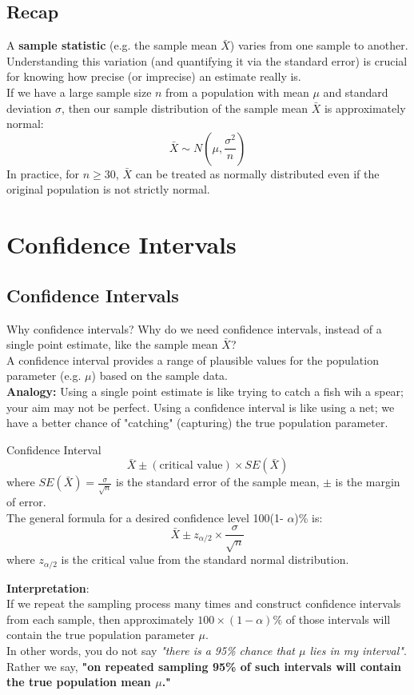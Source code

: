 \documentclass[10pt]{extarticle}
\begin{document}
\subsection{Recap}
A \textbf{sample statistic} (e.g. the sample mean $\bar{X}$) varies from one sample to another. Understanding this variation (and quantifying it via the standard error) is crucial for knowing how precise (or imprecise) an estimate really is. \\[2ex]
If we have a large sample size $n$ from a population with mean $\mu$ and standard deviation $\sigma$, then our sample distribution of the sample mean $\bar{X}$ is approximately normal:
$$\bar{X} \sim N\left(\mu, \frac{\sigma^2}{n}\right)$$
In practice, for $n \geq 30$, $\bar{X}$ can be treated as normally distributed even if the original population is not strictly normal.

\section{Confidence Intervals}

\subsection{Confidence Intervals}
\begin{conceptbox}{Why confidence intervals?}{}
    Why do we need confidence intervals, instead of a single point estimate, like the sample mean $\bar{X}$? \\

    A confidence interval provides a range of plausible values for the population parameter (e.g. $\mu$) based on the sample data. \\

    \textbf{Analogy:}  Using a single point estimate is like trying to catch a fish wih a spear; your aim may not be perfect. Using a confidence interval is like using a net; we have a better chance of "catching" (capturing) the true population parameter.
\end{conceptbox}
\begin{definitionbox}{Confidence Interval}{}
    $$\bar{X} \pm (\text{critical value}) \times SE(\bar{X})$$
    where $SE(\bar{X}) = \frac{\sigma}{\sqrt{n}}$ is the standard error of the sample mean, $\pm$ is the margin of error. \\
    The general formula for a desired confidence level 100(1- $\alpha$)\% is:
    $$\bar{X} \pm z_{\alpha/2} \times \frac{\sigma}{\sqrt{n}}$$
    where $z_{\alpha/2}$ is the critical value from the standard normal distribution.
\end{definitionbox}
\noindent\textbf{Interpretation}: \\
If we repeat the sampling process many times and construct confidence intervals from each sample, then approximately $100 \times (1 - \alpha)\%$ of those intervals will contain the true population parameter $\mu$.\\
In other words, you do not say \emph{"there is a 95\% chance that $\mu$ lies in my interval"}. Rather we say, \textbf{"on repeated sampling 95\% of such intervals will contain the true population mean $\mu$."}
\end{document}
